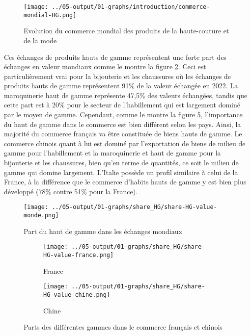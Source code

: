 \documentclass[french,10pt,a4paper]{article}
\begin{document}
\begin{figure}[!h]
  \centering
  \texttt{[image: ../05-output/01-graphs/introduction/commerce-mondial-HG.png]}
  \caption{Evolution du commerce mondial des produits de la haute-couture et de la mode}
  \label{fig:commerce-mondial-HG}
\end{figure}

Ces échanges de produits hauts de gamme représentent une forte part des échanges en valeur mondiaux comme le montre la figure \ref{fig:share-HG-value-monde}. Ceci est particulièrement vrai pour la bijouterie et les chaussures où les échanges de produits hauts de gamme représentent 91\% de la valeur échangée en 2022. La maroquinerie haut de gamme représente 47,5\% des valeurs échangées, tandis que cette part est à 20\% pour le secteur de l'habillement qui est largement dominé par le moyen de gamme. Cependant, comme le montre la figure \ref{fig:share-HG-value-france-chine}, l'importance du haut de gamme dans le commerce est bien différent selon les pays. Ainsi, la majorité  du commerce français va être constituée de biens hauts de gamme. Le commerce chinois quant à lui est dominé par l'exportation de biens de milieu de gamme pour l'habillement et la maroquinerie et haut de gamme pour la bijouterie et les chaussures, bien qu'en terme de quantités, ce soit le milieu de gamme qui domine largement. L'Italie possède un profil similaire à celui de la France, à la différence que le commerce d'habits hauts de gamme y est bien plus développé (78\% contre 51\% pour la France). 

\begin{figure}[!h]
  \centering
  \texttt{[image: ../05-output/01-graphs/share\_HG/share-HG-value-monde.png]}
  \caption{Part du haut de gamme dans les échanges mondiaux}
  \label{fig:share-HG-value-monde}
\end{figure}


\begin{figure}[!h]
  \centering
  \begin{subfigure}{\textwidth}
    \centering    
    \texttt{[image: ../05-output/01-graphs/share\_HG/share-HG-value-france.png]}
    \caption{France}
    \label{fig:share-HG-value-france}
  \end{subfigure}
  \vspace{0.5cm}
  \begin{subfigure}{\textwidth}
    \centering
 \texttt{[image: ../05-output/01-graphs/share\_HG/share-HG-value-chine.png]}
 \caption{Chine}
 \label{fig:share-HG-value-chine}
  \end{subfigure}
  \caption{Parts des différentes gammes dans le commerce français et chinois}
  \label{fig:share-HG-value-france-chine}
\end{figure}
\end{document}
